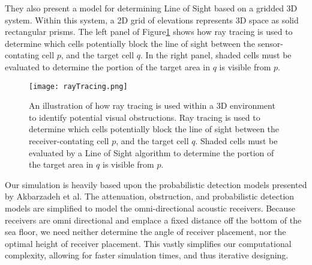 They also present a model for determining Line of Sight based on a gridded 3D system.  Within this system, a 2D grid of elevations represents 3D space as solid rectangular prisms.  The left panel of Figure\ref{rayTracing} shows how ray tracing is used to determine which cells potentially block the line of sight between the sensor-contating cell $p$, and the target cell $q$.  In the right panel, shaded cells must be evaluated to determine the portion of the target area in $q$ is visible from $p$.
\begin{figure}[t]
	\label{rayTracing}
	\centering
	\texttt{[image: rayTracing.png]}
	\caption{An illustration of how ray tracing is used within a 3D environment to identify potential visual obstructions.  Ray tracing is used to determine which cells potentially block the line of sight between the receiver-contating cell $p$, and the target cell $q$.  Shaded cells must be evaluated by a Line of Sight algorithm to determine the portion of the target area in $q$ is visible from $p$. \cite{Akbarzadeh2013}}
\end{figure}

Our simulation is heavily based upon the probabilistic detection models presented by Akbarzadeh et al.  The attenuation, obstruction, and probabilistic detection models are simplified to model the omni-directional acoustic receivers.  Because receivers are omni directional and emplace a fixed distance off the bottom of the sea floor, we need neither determine the angle of receiver placement, nor the optimal height of receiver placement.  This vastly simplifies our computational complexity, allowing for faster simulation times, and thus iterative designing.

